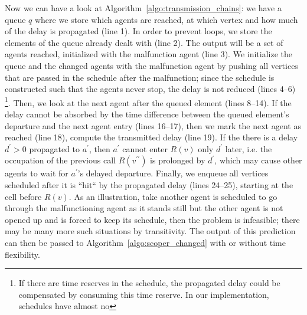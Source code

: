 \documentclass{article}
\begin{document}
Now we can have a look at Algorithm~\ref{algo:transmission_chains}: we have a queue $q$ where we store which agents are reached, at which vertex and how much of the delay is propagated (line 1). In order to prevent loops, we store the elements of the queue already dealt with (line 2).  The output will be a set of agents reached, initialized with the malfunction agent (line 3).
We initialize the queue and the changed agents with the malfunction agent by pushing all vertices that are passed in the schedule after the malfunction; since the schedule is constructed such that the agents never stop, the delay is not reduced (lines 4--6) \footnote{If there are time reserves in the schedule, the propagated delay could be compensated by consuming this time reserve. In our implementation, schedules have almost no }.
Then, we look at the next agent after the queued element (lines 8--14). If the delay cannot be absorbed by the time difference between the queued element's departure and the next agent entry (lines 16--17), then we mark the next agent as reached (line 18),
compute the transmitted delay (line 19).
If the there is a delay $d^\prime >0$ propagated to $a^\prime$, then $a^\prime$ cannot enter $R(v)$ only $d^\prime$ later, i.e. the occupation of the previous call $R(v^{\prime\prime})$ is prolonged by $d^\prime$, which may cause other agents to wait for $a^\prime$'s delayed departure. Finally, we  enqueue all vertices scheduled after it is ``hit`` by the propagated delay (lines 24--25), starting at the cell before $R(v)$.
As an illustration, take another agent is scheduled to go through the malfunctioning agent as it stands still but the other agent is not opened up and is forced to keep its schedule, then the problem is infeasible; there may be many more such situations by transitivity. The output of this prediction can then be passed to Algorithm~\ref{algo:scoper_changed} with or without time flexibility.
\end{document}
